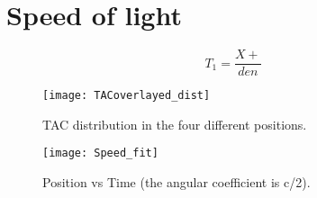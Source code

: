 \section*{Speed of light}

\begin{equation}
T_1 = \frac{X+}{den}
\end{equation}


\begin{figure}[h!]
\centering
\texttt{[image: TACoverlayed\_dist]}
\caption{TAC distribution in the four different positions.}
\end{figure}
 
\begin{figure}[h!]
\centering
\texttt{[image: Speed\_fit]}
\caption{Position vs Time (the angular coefficient is c/2).}
\end{figure}
